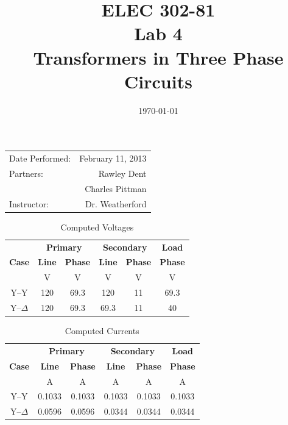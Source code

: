 \documentclass{article}
\title{ELEC 302-81\\ Lab 4\\ Transformers in Three Phase Circuits} %
\date{\today} %
\begin{document}
\maketitle

\begin{center}
  \begin{tabular}{lr}
    Date Performed: & February 11, 2013 \\
    Partners: & Rawley Dent \\
              & Charles Pittman \\
    Instructor: & Dr. Weatherford
  \end{tabular}
\end{center}

\pagebreak


\begin{table}[H]
  \centering
  \begin{tabular}{*{6}{c}}

    & \multicolumn{2}{c}{\textbf{Primary}}
    & \multicolumn{2}{c}{\textbf{Secondary}} & \textbf{Load} \\

    \textbf{Case} & \textbf{Line} & \textbf{Phase} & \textbf{Line} &
    \textbf{Phase} & \textbf{Phase} \\

    & V & V & V & V & V \\
    \hline

    Y--Y        & 120 & 69.3 & 120 & 11 & 69.3 \\
    Y--$\Delta$ & 120 & 69.3 & 69.3 & 11 & 40 \\
  \end{tabular}
  \caption{Computed Voltages}
  \label{tab:volt_comp}
\end{table}

\begin{table}[H]
  \centering
  \begin{tabular}{*{6}{c}}
    & \multicolumn{2}{c}{\textbf{Primary}}
    & \multicolumn{2}{c}{\textbf{Secondary}} & \textbf{Load} \\

    \textbf{Case} & \textbf{Line} & \textbf{Phase} & \textbf{Line} &
    \textbf{Phase} & \textbf{Phase} \\

    & A & A & A & A & A \\
    \hline

    Y--Y        & 0.1033 & 0.1033 & 0.1033 & 0.1033 & 0.1033 \\
    Y--$\Delta$ & 0.0596 & 0.0596 & 0.0344 & 0.0344 & 0.0344 \\
  \end{tabular}
  \caption{Computed Currents}
  \label{tab:curr_comp}
\end{table}
\end{document}
